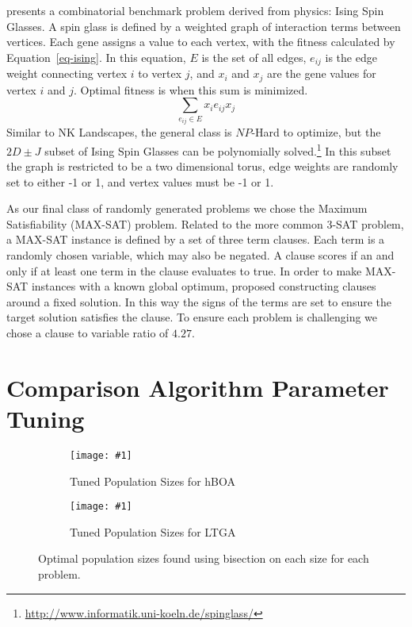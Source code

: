 \documentclass[twoside]{article}
\newcommand{\includegraphicsfit}[1]
{\texttt{[image: \#1]}}
\begin{document}
\cite{saul:1994:spinglass} presents a combinatorial benchmark problem derived from physics:
Ising Spin Glasses. A spin glass is defined by a weighted graph of interaction terms between vertices.
Each gene assigns a value to each vertex, with the fitness calculated by Equation~\ref{eq-ising}.
In this equation, $E$ is the set of all edges, $e_{ij}$ is the edge weight connecting vertex $i$ to vertex $j$, and
$x_i$ and $x_j$ are the gene values for vertex $i$ and $j$. Optimal fitness is when this sum is minimized.
\begin{equation}
\sum_{e_{ij} \in E} x_ie_{ij}x_j
  \label{eq-ising}
\end{equation}
Similar to NK Landscapes, the general class is $NP$-Hard to optimize, but the $2D\pm J$ subset of
Ising Spin Glasses can be polynomially solved.\footnote{\url{http://www.informatik.uni-koeln.de/spinglass/}}
In this subset the graph is restricted to be a two dimensional torus, edge weights are randomly set
to either -1 or 1, and vertex values must be -1 or 1.

As our final class of randomly generated problems we chose the Maximum Satisfiability (MAX-SAT) problem.
Related to the more common 3-SAT problem, a MAX-SAT instance is defined by a set of three term clauses.
Each term is a randomly chosen variable, which may also be negated. A clause scores if an and only if
at least one term in the clause evaluates to true. In order to make MAX-SAT instances with a known global
optimum, \cite{goldman:2014:p3} proposed constructing clauses around a fixed solution. In this way the
signs of the terms are set to ensure the target solution satisfies the clause. To ensure each
problem is challenging we chose a clause to variable ratio of $4.27$.

\section{Comparison Algorithm Parameter Tuning}
\label{sec-tuning}

\begin{figure}[t]
  \begin{centering}
    \begin{subfigure}{.5\textwidth}
      \begin{centering}
        \includegraphicsfit{pop-hboa}
      \end{centering}
      \caption{Tuned Population Sizes for hBOA}
      \label{fig-pop-hboa}
    \end{subfigure}%
    \begin{subfigure}{.5\textwidth}
      \begin{centering}
        \includegraphicsfit{pop-ltga}
      \end{centering}
      \caption{Tuned Population Sizes for LTGA}
      \label{fig-pop-ltga}
    \end{subfigure}
  \end{centering}
  \caption{Optimal population sizes found using bisection on each size
           for each problem.}
  \label{fig-pop-sizes}
\end{figure}
\end{document}
